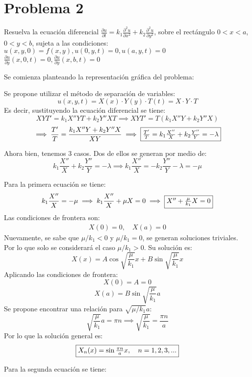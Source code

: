 \section{Problema 2}
Resuelva la ecuación diferencial $\frac{\partial u}{\partial t}=k_{1} \frac{\partial^{2} u}{\partial x^{2}}+k_{2} \frac{\partial^{2} u}{\partial y^{2}}$, sobre el rectángulo $0<x<a$,
$0<y<b$, sujeta a las condiciones: $u(x, y, 0)=f(x, y), u(0, y, t)=0, u(a, y, t)=0$
$\frac{\partial u}{\partial y}(x, 0, t)=0, \frac{\partial u}{\partial y}(x, b, t)=0$

\begin{solution}
Se comienza planteando la representación gráfica del problema: 


Se propone utilizar el método de separación de variables: 
$$u(x,y,t)=X(x)\cdot Y(y)\cdot T(t) =X\cdot Y \cdot T $$
Es decir, sustituyendo la ecuación diferencial se tiene: 
$$XYT'= k_1 X''YT+k_2Y''XT\implies XYT'= T(k_1 X''Y+k_2Y''X)$$
$$\implies \frac{T'}{T}= \frac{k_1X''Y+k_2Y''X}{XY}\implies\fbox{$ \frac{T'}{T}=k_1\frac{X''}{X}+k_2\frac{Y''}{Y}=-\lambda$}$$

\linea 

Ahora bien, tenemos 3 casos. Dos de ellos se generan por medio de: 
$$k_1\frac{X''}{X}+k_2\frac{Y''}{Y}=-\lambda\implies k_1\frac{X''}{X} = -k_2\frac{Y''}{Y} -\lambda = -\mu $$

\linea 

Para la primera ecuación se tiene: 
$$k_1\frac{X''}{X}=-\mu\implies k_1\frac{X''}{X}+\mu X=0 \implies \fbox{$X''+\frac{\mu}{k_1}X=0$}$$
Las condiciones de frontera son:
\begin{gather*}
    X(0)= 0, \quad X(a)=0 
\end{gather*}
Nuevamente, se sabe que $\mu/k_1<0$ y $\mu/k_1=0$, se generan soluciones triviales. Por lo que solo se considerará el caso $\mu/k_1>0$. Su solución es: 
$$X(x)=A\cos \sqrt{\frac{\mu}{k_1}} x+B\sin \sqrt{\frac{\mu}{k_1}} x$$
Aplicando las condiciones de frontera: 
$$X(0)= A = 0 $$
$$X(a)=B\sin \sqrt{\frac{\mu}{k_1}}a$$
Se propone encontrar una relación para $\sqrt{\mu/k_1}a$:
$$\sqrt{\frac{\mu}{k_1}}a = \pi n\implies\sqrt{\frac{\mu}{k_1}} = \frac{\pi n}{a} $$
Por lo que la solución general es: 
$$\fbox{$X_n(x)= \sin\frac{\pi n}{a}x, \quad n=1,2,3,...$}$$
\linea 

Para la segunda ecuación se tiene: 


\end{solution}
